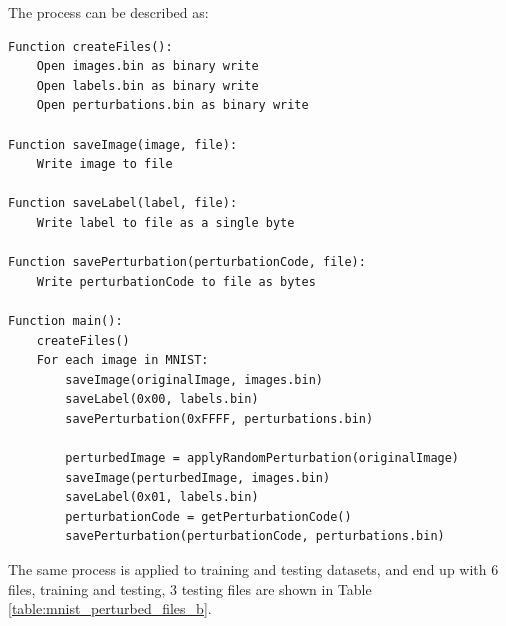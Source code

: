 The process can be described as:

\begin{lstlisting}[caption={MNIST Perturbation Algorithm}, label={lst:mnist_perturbation_algorithm}]
Function createFiles():
    Open images.bin as binary write
    Open labels.bin as binary write
    Open perturbations.bin as binary write

Function saveImage(image, file):
    Write image to file

Function saveLabel(label, file):
    Write label to file as a single byte

Function savePerturbation(perturbationCode, file):
    Write perturbationCode to file as bytes

Function main():
    createFiles()
    For each image in MNIST:
        saveImage(originalImage, images.bin)
        saveLabel(0x00, labels.bin)
        savePerturbation(0xFFFF, perturbations.bin)
        
        perturbedImage = applyRandomPerturbation(originalImage)
        saveImage(perturbedImage, images.bin)
        saveLabel(0x01, labels.bin)
        perturbationCode = getPerturbationCode()
        savePerturbation(perturbationCode, perturbations.bin)

\end{lstlisting}

The same process is applied to training and testing datasets, and end up with 6 files, training and testing, 3 testing files are shown in Table \ref{table:mnist_perturbed_files_b}.


